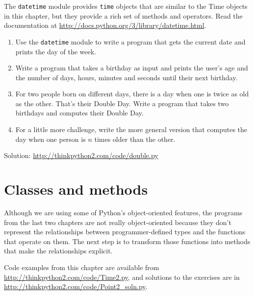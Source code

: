 \documentclass[10pt]{book}
\begin{document}
\begin{exercise}

The {\tt datetime} module provides {\tt time} objects
that are similar to the Time objects in this chapter, but
they provide a rich set of methods and operators.  Read the
documentation at \url{http://docs.python.org/3/library/datetime.html}.

\begin{enumerate}

\item Use the {\tt datetime} module to write a program that gets the
  current date and prints the day of the week.

\item Write a program that takes a birthday as input and prints the
  user's age and the number of days, hours, minutes and seconds until
  their next birthday.

\item For two people born on different days, there is a day when one
  is twice as old as the other.  That's their Double Day.  Write a
  program that takes two birthdays and computes their Double Day.

\item For a little more challenge, write the more general version that
  computes the day when one person is $n$ times older than the other.

\end{enumerate}

Solution: \url{http://thinkpython2.com/code/double.py}

\end{exercise}


\chapter{Classes and methods}

Although we are using some of Python's object-oriented features,
the programs from the last two chapters are not really
object-oriented because they don't represent the relationships
between programmer-defined types and the functions that operate
on them.  The next step is to transform those functions into
methods that make the relationships explicit.

Code examples from this chapter are available from
\url{http://thinkpython2.com/code/Time2.py}, and solutions
to the exercises are in \url{http://thinkpython2.com/code/Point2_soln.py}.
\end{document}
